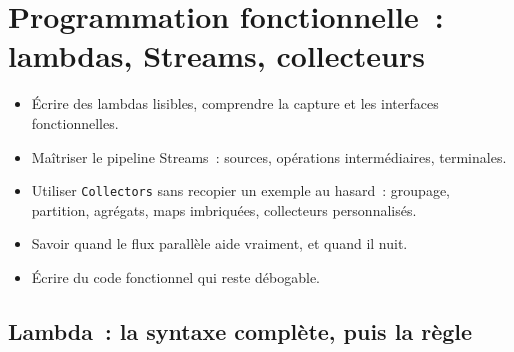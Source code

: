 \chapter{Programmation fonctionnelle~: lambdas, Streams, collecteurs}
\label{ch-java-fonctionnel}

\begin{objectif}
\begin{itemize}
  \item \'Ecrire des lambdas lisibles, comprendre la capture et les interfaces fonctionnelles.
  \item Ma\^itriser le pipeline Streams~: sources, op\'erations interm\'ediaires, terminales.
  \item Utiliser \texttt{Collectors} sans recopier un exemple au hasard~: groupage, partition,
        agr\'egats, maps imbriqu\'ees, collecteurs personnalis\'es.
  \item Savoir quand le flux parall\`ele aide vraiment, et quand il nuit.
  \item \'Ecrire du code fonctionnel qui reste d\'ebogable.
\end{itemize}
\end{objectif}

\section{Lambda~: la syntaxe compl\`ete, puis la r\`egle}

